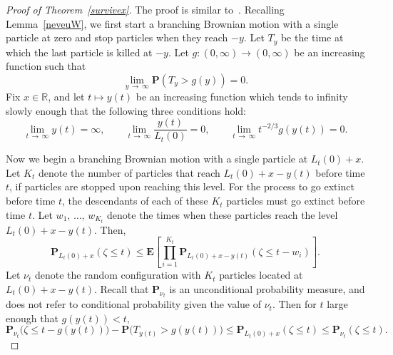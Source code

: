 \documentclass[10pt]{amsart}
\theoremstyle{definition}\newtheorem{defi}[theo]{Definition}\newtheorem{rema}[theo]{Remark}\newtheorem{exam}[theo]{Example}\newtheorem{exem}[theo]{Example}\newtheorem{nota}[theo]{Notation}
\newcommand*\E{\mathbf{E}}
\renewcommand*\P{\mathbf{P}}
\newcommand*\R{\mathbb{R}}
\newcommand{\1} {\mathds{1}}
\begin{document}
\begin{proof}[Proof of Theorem~\ref{survivex}]
The proof is similar to~\cite[the proof of Theorem~1]{bbs4}. Recalling Lemma~\ref{neveuW}, we first start a branching Brownian motion with a single particle at zero and stop particles when they reach $-y$. Let $T_y$ be the time at which the last particle is killed at $-y$. Let $g: (0, \infty) \rightarrow (0, \infty)$ be an increasing function such that
\begin{equation}\label{Tygy}
\lim_{y\,\rightarrow\,\infty} \P\left(T_y > g(y)\right) = 0.
\end{equation}
Fix $x \in \R$, and let $t \mapsto y(t)$ be an increasing function which tends to infinity slowly enough that the following three conditions hold:
\begin{equation}\label{ycond}
\lim_{t\,\rightarrow\,\infty} y(t) = \infty, \qquad \lim_{t\, \rightarrow\,\infty} \frac{y(t)}{L_t(0)} = 0, \qquad \lim_{t\,\rightarrow\,\infty} t^{-2/3} g(y(t)) = 0.
\end{equation}

Now we begin a branching Brownian motion with a single particle at $L_t(0) + x$. Let $K_t$ denote the number of particles that reach $L_t(0) + x - y(t)$ before time $t$, if particles are stopped upon reaching this level. For the process to go extinct before time $t$, the descendants of each of these $K_t$ particles must go extinct before time $t$.
Let $w_1,\,\dots,\,w_{K_t}$ denote the times when these particles reach the level $L_t(0) + x - y(t)$. Then,
\[
\P_{L_t(0) + x}(\zeta \leq t) \leq \E \left[\prod_{i=1}^{K_t} \P_{L_t(0) + x - y(t)}\left(\zeta \leq t - w_i\right) \right].
\]
Let $\nu_t$ denote the random configuration with $K_t$ particles located at $L_t(0) + x - y(t)$. Recall that $\P_{\nu_t}$ is an unconditional probability measure, and does not refer to conditional probability given the value of $\nu_t$. Then for $t$ large enough that $g(y(t)) < t$,
\begin{equation}\label{extsqueeze}
\P_{\nu_t}\big(\zeta \leq t - g(y(t))\big) - \P\big(T_{y(t)} > g(y(t))\big) \leq \P_{L_t(0) + x}(\zeta \leq t) \leq \P_{\nu_t}(\zeta \leq t).
\end{equation}


\end{proof}
\end{document}
